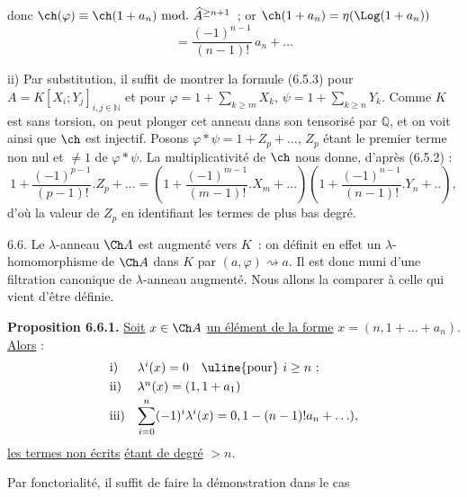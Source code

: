 
donc \(\ch(\varphi)\equiv\ch(1+a_n)\ \mathrm{mod.}\ \widehat A^{\ge n+1}\)~; or \(\ch(1+a_n)=\eta(\Log(1+a_n))\)
\[
  =\frac{(-1)^{n-1}}{(n-1)!}\,a_n+\ldots
\]

ii) Par substitution, il suffit de montrer la formule (6.5.3) pour \(A=K[X_i;Y_j]_{i,j\in\mathbb N}\) et pour \(\varphi=1+\sum_{k\ge m}X_k\), \(\psi=1+\sum_{k\ge n}Y_k\). Comme \(K\) est sans torsion, on peut plonger cet anneau dans son tensorisé par \(\mathbb Q\), et on voit ainsi que \(\ch\) est injectif. Posons \(\varphi*\psi=1+Z_p+\ldots\), \(Z_p\) étant le premier terme non nul et \(\neq1\) de \(\varphi*\psi\). La multiplicativité de \(\ch\) nous donne, d'après (6.5.2) :
\[
  1+\frac{(-1)^{p-1}}{(p-1)!}.Z_p+\ldots
  =
  \left(1+\frac{(-1)^{m-1}}{(m-1)!}.X_m+\ldots\right)
  \left(1+\frac{(-1)^{n-1}}{(n-1)!}.Y_n+..\right),
\]
d'où la valeur de \(Z_p\) en identifiant les termes de plus bas degré.

6.6. Le \(\lambda\)-anneau \(\Ch A\) est augmenté vers \(K\)~: on définit en effet un \(\lambda\)-homomorphisme de \(\Ch A\) dans \(K\) par \((a,\varphi)\rightsquigarrow a\). Il est donc muni d'une filtration canonique de \(\lambda\)-anneau augmenté. Nous allons la comparer à celle qui vient d'être définie.

\textbf{Proposition 6.6.1.} \uline{Soit} \(x\in\Ch A\) \uline{un élément de la forme} \(x=(n,1+\ldots+a_n)\). \uline{Alors} :
\[
\begin{array}{ll}
\text{i)}& \lambda^i(x)=0\quad\text{\uline{pour} }i\ge n~;\\[0.3em]
\text{ii)}& \lambda^n(x)=(1,1+a_1)\\[0.3em]
\text{iii)}& \displaystyle\sum_{i=0}^n(-1)^i\lambda^i(x)
       =0,1-(n-1)!a_n+\ldots),
\end{array}
\]
\uline{les termes non écrits} \uline{étant de degré} \(>n\).

Par fonctorialité, il suffit de faire la démonstration dans le cas 
